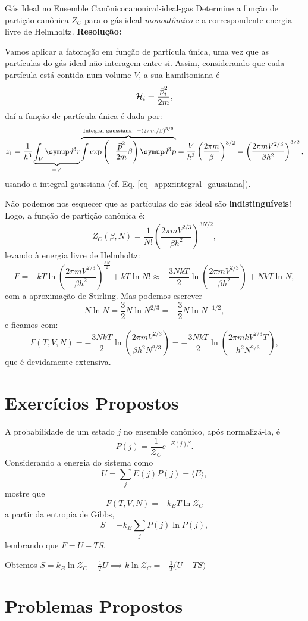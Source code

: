 \begin{solved}{Gás Ideal no Ensemble Canônico}{canonical-ideal-gas}
    Determine a função de partição canônica $Z_C$ para o gás ideal \textit{monoatômico} e a correspondente energia livre de Helmholtz.
    \tcblower
    \textbf{Resolução:}

    Vamos aplicar a fatoração em função de partícula única, uma vez que as partículas do gás ideal não interagem entre si. Assim, considerando que cada partícula está contida num volume $V$, a sua hamiltoniana é \[\mathcal{H}_i=\frac{\vec\p_i^2}{2m},\] daí a função de partícula única é dada por: \[z_1=\frac{1}{h^3}\underbrace{\int_V\diff^3\R}_{=V}\overbrace{\int \exp\left(-\frac{\vec\p^2}{2m}\beta\right)\diff^3\p}^{\text{Integral gaussiana: }=(2\pi m/\beta)^{3/2}}=\frac{V}{h^3}\left(\frac{2\pi m}{\beta}\right)^{3/2}=\left(\frac{2\pi m V^{2/3}}{\beta h^2}\right)^{3/2},\] usando a integral gaussiana (cf. Eq. \eqref{eq_appx:integral_gaussiana}).

    Não podemos nos esquecer que as partículas do gás ideal são \textbf{indistinguíveis}! Logo, a função de partição canônica é: \[ Z_C(\beta,N) = \frac{1}{N!}\left(\frac{2\pi m V^{2/3}}{\beta h^2}\right)^{3N/2},\] levando à energia livre de Helmholtz:
    \[ F=-kT\ln\left(\frac{2\pi m V^{2/3}}{\beta h^2}\right)^{\frac{3N}{2}}+kT\ln N! \approx 
    -\frac{3NkT}{2}\ln\left(\frac{2\pi m V^{2/3}}{\beta h^2}\right)+NkT\ln N,\] com a aproximação de Stirling. Mas podemos escrever \[N\ln N = \frac{3}{2}N\ln N^{2/3} = -\frac{3}{2}N\ln N^{-1/2},\]
    e ficamos com:
    \[ F(T,V,N) = -\frac{3NkT}{2}\ln\left(\frac{2\pi m V^{2/3}}{\beta h^2N^{2/3}}\right) = -\frac{3NkT}{2}\ln\left(\frac{2\pi mk V^{2/3}T}{ h^2N^{2/3}}\right),\] que é devidamente extensiva.
\end{solved}


\newpage
\section*{Exercícios Propostos}
    \begin{questionsbox}
        \begin{question}
            A probabilidade de um estado $j$ no ensemble canônico, após normalizá-la, é \[P(j) =\frac{1}{\mathcal{Z}_C} e^{-E(j)\beta}.\] Considerando a energia do sistema como \[U=\sum_j E(j)P(j)=\langle E\rangle,\] mostre que \[F(T,V,N)=-k_BT\ln\mathcal{Z}_C\] a partir da entropia de Gibbs, \[S=-k_B\sum_{j}P(j)\ln P(j),\] lembrando que $F=U-TS$.
        \end{question}
        \begin{answer}
            Obtemos $S=k_B\ln\mathcal{Z}_C-\frac{1}{T} U\implies k\ln\mathcal{Z}_C=-\frac{1}{T}\big(U-TS\big)$
        \end{answer}
    \end{questionsbox}

\section*{Problemas Propostos}

\begin{problem}[subtitle={Método do ponto-sela}]
    
\end{problem}